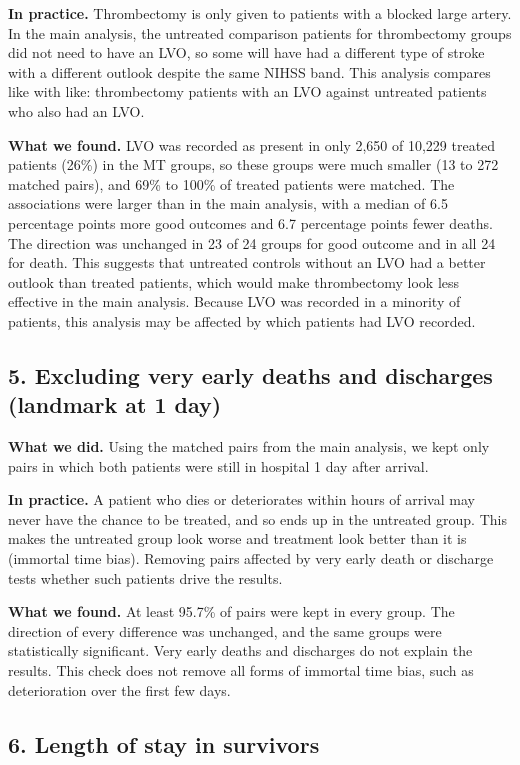 \textbf{In practice.} Thrombectomy is only given to patients with a blocked large artery. In the main analysis, the untreated comparison patients for thrombectomy groups did not need to have an LVO, so some will have had a different type of stroke with a different outlook despite the same NIHSS band. This analysis compares like with like: thrombectomy patients with an LVO against untreated patients who also had an LVO.

\textbf{What we found.} LVO was recorded as present in only 2,650 of 10,229 treated patients (26\%) in the MT groups, so these groups were much smaller (13 to 272 matched pairs), and 69\% to 100\% of treated patients were matched. The associations were larger than in the main analysis, with a median of 6.5 percentage points more good outcomes and 6.7 percentage points fewer deaths. The direction was unchanged in 23 of 24 groups for good outcome and in all 24 for death. This suggests that untreated controls without an LVO had a better outlook than treated patients, which would make thrombectomy look less effective in the main analysis. Because LVO was recorded in a minority of patients, this analysis may be affected by which patients had LVO recorded.

\subsection*{5. Excluding very early deaths and discharges (landmark at 1 day)}

\textbf{What we did.} Using the matched pairs from the main analysis, we kept only pairs in which both patients were still in hospital 1 day after arrival.

\textbf{In practice.} A patient who dies or deteriorates within hours of arrival may never have the chance to be treated, and so ends up in the untreated group. This makes the untreated group look worse and treatment look better than it is (immortal time bias). Removing pairs affected by very early death or discharge tests whether such patients drive the results.

\textbf{What we found.} At least 95.7\% of pairs were kept in every group. The direction of every difference was unchanged, and the same groups were statistically significant. Very early deaths and discharges do not explain the results. This check does not remove all forms of immortal time bias, such as deterioration over the first few days.

\subsection*{6. Length of stay in survivors}

